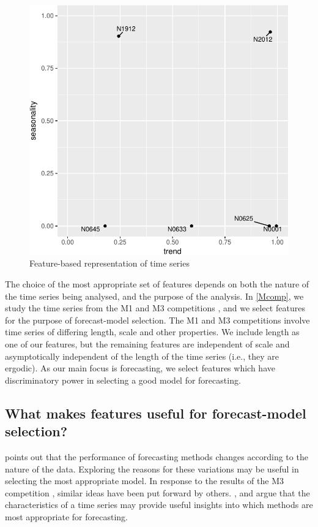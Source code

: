 \documentclass[11pt,a4paper,]{article}
\theoremstyle{definition}
\theoremstyle{definition}
\theoremstyle{definition}
\theoremstyle{remark}
\begin{document}
\begin{figure}

{\centering \includegraphics[width=0.7\linewidth]{figure/fig2-1} 

}

\caption{Feature-based representation of time series}\label{fig:fig2}
\end{figure}

The choice of the most appropriate set of features depends on both the
nature of the time series being analysed, and the purpose of the
analysis. In \autoref{Mcomp}, we study the time series from the M1 and
M3 competitions \autocites{makridakis1982accuracy}{makridakis2000m3},
and we select features for the purpose of forecast-model selection. The
M1 and M3 competitions involve time series of differing length, scale
and other properties. We include length as one of our features, but the
remaining features are independent of scale and asymptotically
independent of the length of the time series (i.e., they are ergodic).
As our main focus is forecasting, we select features which have
discriminatory power in selecting a good model for forecasting.

\hypertarget{what-makes-features-useful-for-forecast-model-selection}{%
\subsection{What makes features useful for forecast-model
selection?}\label{what-makes-features-useful-for-forecast-model-selection}}

\textcite{reid1972comparison} points out that the performance of
forecasting methods changes according to the nature of the data.
Exploring the reasons for these variations may be useful in selecting
the most appropriate model. In response to the results of the M3
competition \autocite{makridakis2000m3}, similar ideas have been put
forward by others. \textcite{hyndman2001s}, \textcite{lawrence2001s} and
\textcite{armstrong2001s} argue that the characteristics of a time
series may provide useful insights into which methods are most
appropriate for forecasting.
\end{document}
